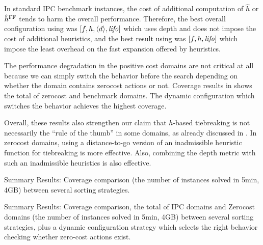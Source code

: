 In standard IPC benchmark instances, the cost of additional computation of
$\hat{h}$ or $\hat{h}^{\text{FF}}$ tends to harm the overall performance.
Therefore, the best overall configuration using \lmcut was
$[f,h,{\left<d\right>},{\text{\textit{lifo}}}]$ which uses depth and does not impose the cost of
additional heuristics, and the best result using \mands
was $[f,h,{\text{\textit{lifo}}}]$ which impose the least overhead on the fast expansion offered by
\mands heuristics.

The performance degradation in the positive cost domains are not
critical at all because we can simply switch the behavior before the
search depending on whether the domain contains zerocost actions or not.
Coverage results in  shows the total of
zerocost and benchmark domains. The dynamic configuration which switches
the behavior achieves the highest coverage.


Overall, these results also strengthen our claim that $h$-based
tiebreaking is not necessarily the ``rule of the thumb'' in some
domains, as already discussed in . In zerocost domains,
using a distance-to-go version of an inadmissible heuristic function for
tiebreaking is more effective. Also, combining the depth metric with
such an inadmissible heuristics is also effective.


\begin{table}[htbp]
 \centering
 
 \caption{
 Summary Results: Coverage comparison (the number
 of instances solved in 5min, 4GB) between several sorting strategies.
 }
 \label{tbl:dtg-summary}
\end{table}

\begin{table}[htbp]
 \centering 
 \caption{ Summary Results:
 Coverage comparison, the total of IPC domains and Zerocost domains (the
 number of instances solved in 5min, 4GB) between several sorting
 strategies, plus a dynamic configuration strategy which selects the
 right behavior checking whether zero-cost actions exist.  }
 \label{tbl:dtg-summary-sum}
\end{table}

